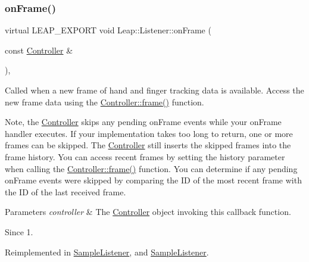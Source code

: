 \subsubsection{\texorpdfstring{on\+Frame()}{onFrame()}}
{\footnotesize\ttfamily virtual L\+E\+A\+P\+\_\+\+E\+X\+P\+O\+RT void Leap\+::\+Listener\+::on\+Frame (\begin{DoxyParamCaption}\item[{const \hyperlink{class_leap_1_1_controller}{Controller} \&}]{ }\end{DoxyParamCaption})\hspace{0.3cm}{\ttfamily [inline]}, {\ttfamily [virtual]}}

Called when a new frame of hand and finger tracking data is available. Access the new frame data using the \hyperlink{class_leap_1_1_controller_acb45e24fc2583045212f2cfec613f5b0}{Controller\+::frame()} function.


\begin{DoxyCodeInclude}
\end{DoxyCodeInclude}


Note, the \hyperlink{class_leap_1_1_controller}{Controller} skips any pending on\+Frame events while your on\+Frame handler executes. If your implementation takes too long to return, one or more frames can be skipped. The \hyperlink{class_leap_1_1_controller}{Controller} still inserts the skipped frames into the frame history. You can access recent frames by setting the history parameter when calling the \hyperlink{class_leap_1_1_controller_acb45e24fc2583045212f2cfec613f5b0}{Controller\+::frame()} function. You can determine if any pending on\+Frame events were skipped by comparing the ID of the most recent frame with the ID of the last received frame.


\begin{DoxyParams}{Parameters}
{\em controller} & The \hyperlink{class_leap_1_1_controller}{Controller} object invoking this callback function. \\
\hline
\end{DoxyParams}
\begin{DoxySince}{Since}
1. 
\end{DoxySince}


Reimplemented in \hyperlink{class_sample_listener_a39698af250954a27afb4a875ff0af38a}{Sample\+Listener}, and \hyperlink{class_sample_listener_a9ae2f07da65353a8bda75c6807ecee35}{Sample\+Listener}.

\mbox{\label{class_leap_1_1_listener_a2c2f4e7729f19f6fd70b71c781e4c95c}} 

